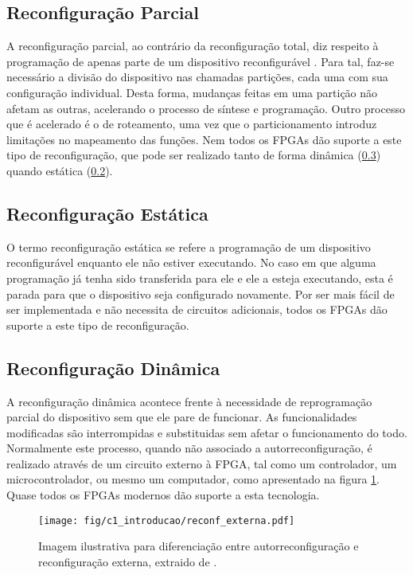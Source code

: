 \documentclass[11pt,a4paper,oneside]{book}
\begin{document}
\subsection{Reconfigura\c{c}\~ao Parcial}
A reconfigura\c{c}\~ao parcial, ao contr\'ario da reconfigura\c{c}\~ao total, diz respeito \`a programa\c{c}\~ao de apenas parte de um dispositivo reconfigur\'avel \cite{Hauck2007}.
Para tal, faz-se necess\'ario a divis\~ao do dispositivo nas chamadas parti\c{c}\~oes, cada uma com sua configura\c{c}\~ao individual.
Desta forma, mudan\c{c}as feitas em uma parti\c{c}\~ao n\~ao afetam as outras, acelerando o processo de s\'i­ntese e programa\c{c}\~ao.
Outro processo que \'e acelerado \'e o de roteamento, uma vez que o particionamento introduz limita\c{c}\~oes no mapeamento das fun\c{c}\~oes.
Nem todos os FPGAs d\~ao suporte a este tipo de reconfigura\c{c}\~ao, que pode ser realizado tanto de forma dinâmica (\ref{sss:dinamica}) quando estática (\ref{sss:estatica}).

\subsection{Reconfigura\c{c}\~ao Est\'atica}
\label{sss:estatica}
O termo reconfigura\c{c}\~ao est\'atica se refere a programa\c{c}\~ao de um dispositivo reconfigur\'avel enquanto ele n\~ao estiver executando.
No caso em que alguma programa\c{c}\~ao j\'a tenha sido transferida para ele e ele a esteja executando, esta \'e parada para que o dispositivo seja configurado novamente.
Por ser mais f\'acil de ser implementada e n\~ao necessita de circuitos adicionais, todos os FPGAs d\~ao suporte a este tipo de reconfigura\c{c}\~ao.

\subsection{Reconfigura\c{c}\~ao Din\^amica}
\label{sss:dinamica}
A reconfigura\c{c}\~ao din\^amica acontece frente \`a necessidade de reprograma\c{c}\~ao parcial do dispositivo sem que ele pare de funcionar.
As funcionalidades modificadas s\~ao interrompidas e substituidas sem afetar o funcionamento do todo.
Normalmente este processo, quando n\~ao associado a autorreconfigura\c{c}\~ao, \'e realizado atrav\'es de um circuito externo à FPGA, tal como um controlador, um microcontrolador, ou mesmo um computador, como apresentado na figura \ref{fig:rexterna}.
Quase todos os FPGAs modernos d\~ao suporte a esta tecnologia.

\begin{figure}[htp]
\centering
\texttt{[image: fig/c1\_introducao/reconf\_externa.pdf]}
\caption{Imagem ilustrativa para diferenciação entre autorreconfiguração e reconfiguração externa, extraido de \cite{wp374}.}
\label{fig:rexterna}
\end{figure}
\end{document}
